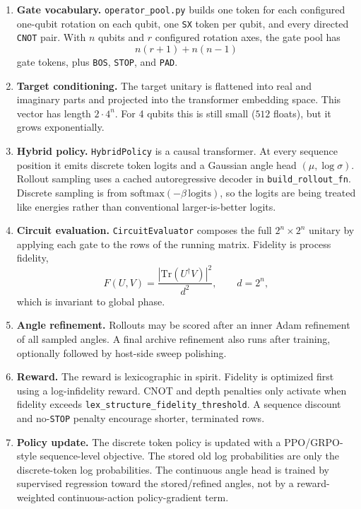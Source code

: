 \documentclass[11pt]{article}
\begin{document}
\begin{enumerate}[leftmargin=*]
  \item \textbf{Gate vocabulary.}  \texttt{operator\_pool.py} builds one token
  for each configured one-qubit rotation on each qubit, one \texttt{SX} token per
  qubit, and every directed \texttt{CNOT} pair.  With \(n\) qubits and \(r\)
  configured rotation axes, the gate pool has
  \[
    n(r+1) + n(n-1)
  \]
  gate tokens, plus \texttt{BOS}, \texttt{STOP}, and \texttt{PAD}.

  \item \textbf{Target conditioning.}  The target unitary is flattened into
  real and imaginary parts and projected into the transformer embedding space.
  This vector has length \(2 \cdot 4^n\).  For 4 qubits this is still small
  (\(512\) floats), but it grows exponentially.

  \item \textbf{Hybrid policy.}  \texttt{HybridPolicy} is a causal transformer.
  At every sequence position it emits discrete token logits and a Gaussian
  angle head \((\mu,\log\sigma)\).  Rollout sampling uses a cached autoregressive
  decoder in \texttt{build\_rollout\_fn}.  Discrete sampling is from
  \(\mathrm{softmax}(-\beta \,\mathrm{logits})\), so the logits are being treated
  like energies rather than conventional larger-is-better logits.

  \item \textbf{Circuit evaluation.}  \texttt{CircuitEvaluator} composes the
  full \(2^n \times 2^n\) unitary by applying each gate to the rows of the
  running matrix.  Fidelity is process fidelity,
  \[
    F(U,V) = \frac{|\mathrm{Tr}(U^\dagger V)|^2}{d^2},
    \qquad d = 2^n,
  \]
  which is invariant to global phase.

  \item \textbf{Angle refinement.}  Rollouts may be scored after an inner Adam
  refinement of all sampled angles.  A final archive refinement also runs after
  training, optionally followed by host-side sweep polishing.

  \item \textbf{Reward.}  The reward is lexicographic in spirit.  Fidelity is
  optimized first using a log-infidelity reward.  CNOT and depth penalties only
  activate when fidelity exceeds \texttt{lex\_structure\_fidelity\_threshold}.
  A sequence discount and no-\texttt{STOP} penalty encourage shorter, terminated
  rows.

  \item \textbf{Policy update.}  The discrete token policy is updated with a
  PPO/GRPO-style sequence-level objective.  The stored old log probabilities are
  only the discrete-token log probabilities.  The continuous angle head is
  trained by supervised regression toward the stored/refined angles, not by a
  reward-weighted continuous-action policy-gradient term.


\end{enumerate}
\end{document}
